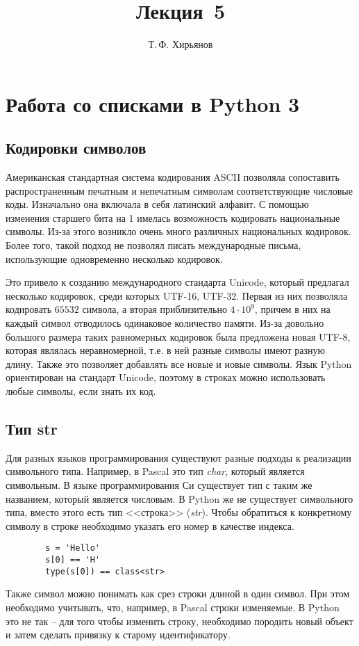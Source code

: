 \documentclass[a4paper, fleqn]{article}
\title{Лекция \textnumero\,5}
\author{Т.\,Ф. Хирьянов}
\date{}
\begin{document}
	\maketitle
	
	\section*{Работа со списками в Python 3}
	
	\subsection*{Кодировки символов}
	
	Американская стандартная система кодирования ASCII позволяла сопоставить распространенным печатным и непечатным символам соответствующие числовые коды. Изначально она включала в себя латинский алфавит. С помощью изменения старшего бита на 1 имелась возможность кодировать национальные символы. Из-за этого возникло очень много  различных национальных кодировок. Более того, такой подход не позволял писать международные письма, использующие одновременно несколько кодировок.
	 
	Это привело к созданию международного стандарта  Unicode, который предлагал несколько кодировок, среди которых UTF-16, UTF-32. Первая из них позволяла кодировать $65532$ символа, а вторая приблизительно $4\cdot10^9$, причем в них на каждый символ отводилось одинаковое количество памяти. Из-за довольно большого размера таких равномерных кодировок была предложена новая UTF-8, которая являлась неравномерной, т.е. в ней разные символы имеют разную длину. Также это позволяет добавлять все новые и новые символы. Язык Python  ориентирован на стандарт Unicode, поэтому в строках можно использовать любые символы, если знать их код.
	
	\subsection*{Тип str}
	
	Для разных языков программирования существуют разные подходы к реализации символьного типа. Например, в Pascal это тип \emph{char}, который  является символьным. В языке программирования Си существует тип с таким же названием, который является числовым.  В Python же не существует символьного типа, вместо этого есть тип <<строка>> (\emph{str}). Чтобы обратиться к  конкретному символу в строке необходимо указать его номер в качестве индекса. 
	\begin{lstlisting}
		s = 'Hello'
		s[0] == 'H'
		type(s[0]) == class<str>
	\end{lstlisting}
	Также символ можно понимать как срез строки длиной в один символ. При этом необходимо учитывать, что, например, в Pascal строки изменяемые. В Python это не так -- для того чтобы изменить строку, необходимо породить новый объект и затем сделать привязку к старому идентификатору. 
	
\end{document}
